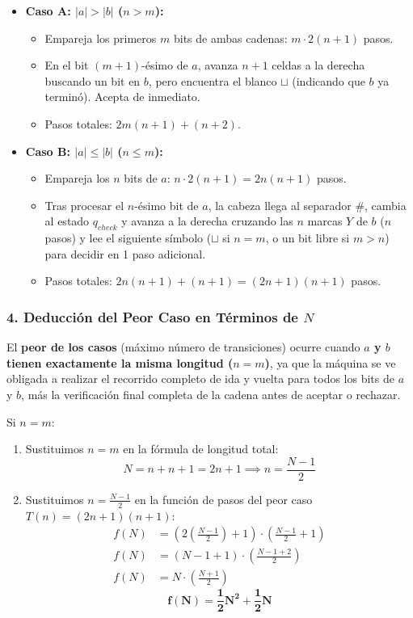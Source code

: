 \begin{itemize}[leftmargin=*]
    \item \textbf{Caso A: $|a| > |b|$ ($n > m$):}
    \begin{itemize}[leftmargin=*]
        \item Empareja los primeros $m$ bits de ambas cadenas: $m \cdot 2(n + 1)$ pasos.
        \item En el bit $(m+1)$-ésimo de $a$, avanza $n + 1$ celdas a la derecha buscando un bit en $b$, pero encuentra el blanco $\sqcup$ (indicando que $b$ ya terminó). Acepta de inmediato.
        \item Pasos totales: $2m(n + 1) + (n + 2)$.
    \end{itemize}
    
    \item \textbf{Caso B: $|a| \le |b|$ ($n \le m$):}
    \begin{itemize}[leftmargin=*]
        \item Empareja los $n$ bits de $a$: $n \cdot 2(n + 1) = 2n(n + 1)$ pasos.
        \item Tras procesar el $n$-ésimo bit de $a$, la cabeza llega al separador $\#$, cambia al estado $q_{check}$ y avanza a la derecha cruzando las $n$ marcas $Y$ de $b$ ($n$ pasos) y lee el siguiente símbolo ($\sqcup$ si $n=m$, o un bit libre si $m>n$) para decidir en 1 paso adicional.
        \item Pasos totales: $2n(n + 1) + (n + 1) = (2n + 1)(n + 1)$ pasos.
    \end{itemize}
\end{itemize}

\subsubsection*{4. Deducción del Peor Caso en Términos de $N$}

El \textbf{peor de los casos} (máximo número de transiciones) ocurre cuando \textbf{$a$ y $b$ tienen exactamente la misma longitud ($n = m$)}, ya que la máquina se ve obligada a realizar el recorrido completo de ida y vuelta para todos los bits de $a$ y $b$, más la verificación final completa de la cadena antes de aceptar o rechazar.

Si $n = m$:
\begin{enumerate}[label=\arabic*., leftmargin=*]
    \item Sustituimos $n = m$ en la fórmula de longitud total:
    \[ N = n + n + 1 = 2n + 1 \implies n = \frac{N - 1}{2} \]
    
    \item Sustituimos $n = \frac{N - 1}{2}$ en la función de pasos del peor caso $T(n) = (2n + 1)(n + 1)$:
    \begin{align*}
        f(N) &= \left(2\left(\frac{N - 1}{2}\right) + 1\right) \cdot \left(\frac{N - 1}{2} + 1\right) \\
        f(N) &= (N - 1 + 1) \cdot \left(\frac{N - 1 + 2}{2}\right) \\
        f(N) &= N \cdot \left(\frac{N + 1}{2}\right)
    \end{align*}
    \[ \mathbf{f(N) = \frac{1}{2}N^2 + \frac{1}{2}N} \]
\end{enumerate}

